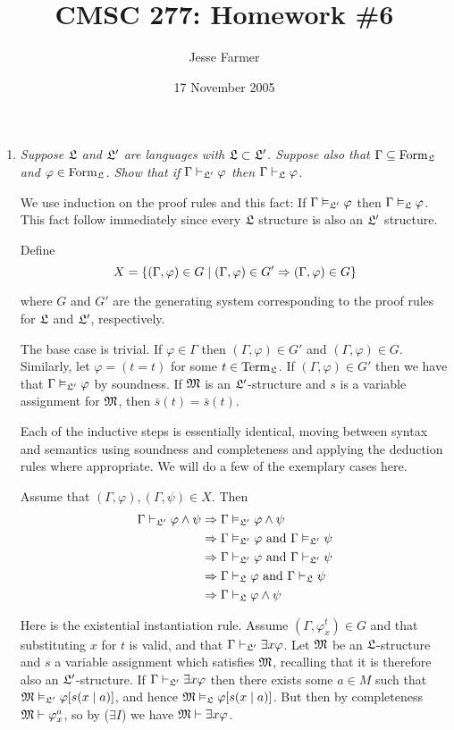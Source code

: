 \documentclass[10pt]{article}
\title{CMSC 277: Homework \#6}
\author{Jesse Farmer}
\date{17 November 2005}
\begin{document}
\maketitle

\begin{enumerate}
\item \emph{Suppose $\mathfrak{L}$ and $\mathfrak{L}'$ are languages with $\mathfrak{L} \subset \mathfrak{L}'$.  Suppose also that $\Gamma \subseteq \operatorname{Form}_{\mathfrak{L}}$ and $\varphi \in \operatorname{Form}_{\mathfrak{L}}$.  Show that if $\Gamma \vdash_{\mathfrak{L}'} \varphi$ then $\Gamma \vdash_{\mathfrak{L}} \varphi$.}

We use induction on the proof rules and this fact: If $\Gamma \vDash_{\mathfrak{L}'} \varphi$ then $\Gamma \vDash_{\mathfrak{L}} \varphi$.  This fact follow immediately since every $\mathfrak{L}$ structure is also an $\mathfrak{L}'$ structure.

Define
\[
X = \left\{ (\Gamma, \varphi) \in G \mid (\Gamma, \varphi) \in G' \Rightarrow (\Gamma, \varphi) \in G \right\}
\]

where $G$ and $G'$ are the generating system corresponding to the proof rules for $\mathfrak{L}$ and $\mathfrak{L}'$, respectively.

The base case is trivial.  If $\varphi \in \Gamma$ then $(\Gamma, \varphi) \in G'$ and $(\Gamma, \varphi) \in G$.  Similarly, let $\varphi = (t=t)$ for some $t \in \operatorname{Term}_{\mathfrak{L}}$.  If $(\Gamma, \varphi) \in G'$ then we have that $\Gamma \vDash_{\mathfrak{L}'} \varphi$ by soundness.  If $\mathfrak{M}$ is an $\mathfrak{L}'$-structure and $s$ is a variable assignment for $\mathfrak{M}$, then $\bar{s}(t) = \bar{s}(t)$.

Each of the inductive steps is essentially identical, moving between syntax and semantics using soundness and completeness and applying the deduction rules where appropriate.  We will do a few of the exemplary cases here.

Assume that $(\Gamma, \varphi), (\Gamma, \psi) \in X$.  Then
\begin{align*}
\Gamma \vdash_{\mathfrak{L}'} \varphi \land \psi &\Rightarrow \Gamma \vDash_{\mathfrak{L}'} \varphi \land \psi \\
&\Rightarrow \Gamma \vDash_{\mathfrak{L}'} \varphi \mbox{ and } \Gamma \vDash_{\mathfrak{L}'} \psi \\
&\Rightarrow \Gamma \vdash_{\mathfrak{L}'} \varphi \mbox{ and } \Gamma \vdash_{\mathfrak{L}'} \psi \\
&\Rightarrow \Gamma \vdash_{\mathfrak{L}} \varphi \mbox{ and } \Gamma \vdash_{\mathfrak{L}} \psi \\
&\Rightarrow \Gamma \vdash_{\mathfrak{L}} \varphi \land \psi
\end{align*}

Here is the existential instantiation rule.  Assume $(\Gamma, \varphi^t_x) \in G$ and that substituting $x$ for $t$ is valid, and that $\Gamma \vdash_{\mathfrak{L}'} \exists x \varphi$.  Let $\mathfrak{M}$ be an $\mathfrak{L}$-structure and $s$ a variable assignment which satisfies $\mathfrak{M}$, recalling that it is therefore also an $\mathfrak{L}'$-structure.  If $\Gamma \vdash_{\mathfrak{L}'} \exists x \varphi$ then there exists some $a \in M$ such that $\mathfrak{M} \vDash_{\mathfrak{L}'} \varphi[s(x \mid a)]$, and hence $\mathfrak{M} \vDash_{\mathfrak{L}} \varphi[s(x \mid a)]$.  But then by completeness $\mathfrak{M} \vdash \varphi_x^a$, so by ($\exists I$) we have $\mathfrak{M} \vdash \exists x \varphi$.


\end{enumerate}
\end{document}
